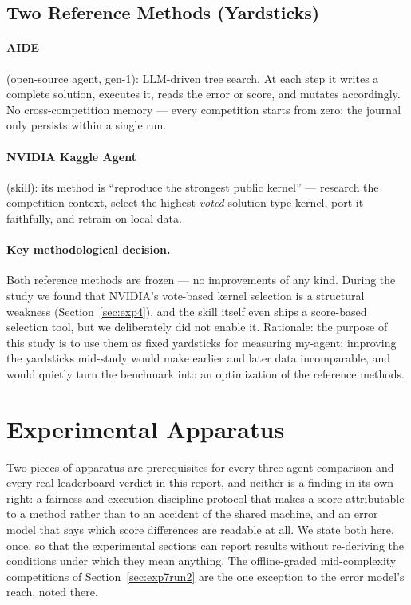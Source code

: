 \documentclass[11pt,a4paper]{article}
\begin{document}
\subsection{Two Reference Methods (Yardsticks)}

\paragraph{AIDE} (open-source agent, gen-1): LLM-driven tree search. At each step it writes a complete solution, executes it, reads the error or score, and mutates accordingly. No cross-competition memory --- every competition starts from zero; the journal only persists within a single run.

\paragraph{NVIDIA Kaggle Agent} (skill): its method is ``reproduce the strongest public kernel'' --- research the competition context, select the highest-\emph{voted} solution-type kernel, port it faithfully, and retrain on local data.

\paragraph{Key methodological decision.} Both reference methods are frozen --- no improvements of any kind. During the study we found that NVIDIA's vote-based kernel selection is a structural weakness (Section~\ref{sec:exp4}), and the skill itself even ships a score-based selection tool, but we deliberately did not enable it. Rationale: the purpose of this study is to use them as fixed yardsticks for measuring my-agent; improving the yardsticks mid-study would make earlier and later data incomparable, and would quietly turn the benchmark into an optimization of the reference methods.

\section{Experimental Apparatus}
\label{sec:apparatus}

Two pieces of apparatus are prerequisites for every three-agent comparison and every
real-leaderboard verdict in this report, and neither is a finding in its own right: a fairness
and execution-discipline protocol that makes a score attributable to a method rather than to an
accident of the shared machine, and an error model that says which score differences are
readable at all. We state both here, once, so that the experimental sections can report results
without re-deriving the conditions under which they mean anything. The offline-graded
mid-complexity competitions of Section~\ref{sec:exp7run2} are the one exception to the error
model's reach, noted there.
\end{document}
